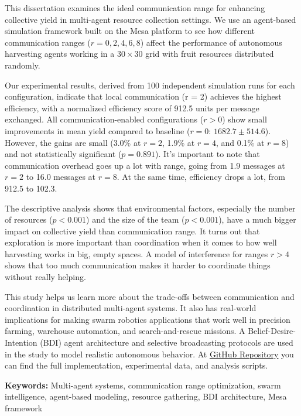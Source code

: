 
This dissertation examines the ideal communication range for enhancing collective yield in multi-agent resource collection settings. We use an agent-based simulation framework built on the Mesa platform to see how different communication ranges ($r = 0, 2, 4, 6, 8$) affect the performance of autonomous harvesting agents working in a $30 \times 30$ grid with fruit resources distributed randomly.

Our experimental results, derived from 100 independent simulation runs for each configuration, indicate that local communication (r = 2) achieves the highest efficiency, with a normalized efficiency score of 912.5 units per message exchanged. All communication-enabled configurations ($r > 0$) show small improvements in mean yield compared to baseline ($r = 0$: $1682.7 \pm 514.6$). However, the gains are small (3.0\% at $r = 2$, 1.9\% at $r = 4$, and 0.1\% at $r = 8$) and not statistically significant ($p = 0.891$). It's important to note that communication overhead goes up a lot with range, going from 1.9 messages at $r = 2$ to 16.0 messages at $r = 8$. At the same time, efficiency drops a lot, from 912.5 to 102.3.

The descriptive analysis shows that environmental factors, especially the number of resources ($p < 0.001$) and the size of the team ($p < 0.001$), have a much bigger impact on collective yield than communication range. It turns out that exploration is more important than coordination when it comes to how well harvesting works in big, empty spaces. A model of interference for ranges $r > 4$ shows that too much communication makes it harder to coordinate things without really helping.

This study helps us learn more about the trade-offs between communication and coordination in distributed multi-agent systems. It also has real-world implications for making swarm robotics applications that work well in precision farming, warehouse automation, and search-and-rescue missions. A Belief-Desire-Intention (BDI) agent architecture and selective broadcasting protocols are used in the study to model realistic autonomous behavior. At \href{https://github.com/marufdevops/multiagent-cooperation-research}{GitHub Repository} you can find the full implementation, experimental data, and analysis scripts.

\textbf{Keywords:} Multi-agent systems, communication range optimization, swarm intelligence, agent-based modeling, resource gathering, BDI architecture, Mesa framework